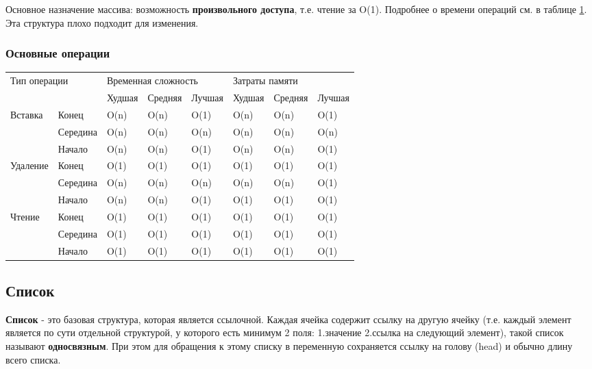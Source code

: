 			Основное назначение массива: возможность \textbf{произвольного доступа}, т.е. чтение за O(1). Подробнее о времени операций см. в таблице \ref{time:arr}.
			Эта структура плохо подходит для изменения.
			
			\subsubsection{Основные операции}
			
\begin{table}[h!]
\label{time:arr}
\begin{tabular}{|l|l|l|l|l|l|l|l|}
\hline
\multicolumn{2}{|l|}{\multirow{2}{*}{Тип операции}} & \multicolumn{3}{l|}{Временная сложность} & \multicolumn{3}{l|}{Затраты памяти} \\ \cline{3-8} 
\multicolumn{2}{|l|}{}                  & Худшая & Средняя & Лучшая & Худшая & Средняя & Лучшая		\\ \hline
\multirow{3}{*}{Вставка}     & Конец 	& O(n) 	 & O(n)    & O(1)   & O(n)   & O(n)    & O(1)		\\ \cline{2-8} 
                             & Середина & O(n) 	 & O(n)    & O(n)   & O(n)   & O(n)    & O(n)		\\ \cline{2-8} 
                             & Начало 	& O(n) 	 & O(n)    & O(1)   & O(n)   & O(n)    & O(1)		\\ \hline
\multirow{3}{*}{Удаление}    & Конец 	& O(1) 	 & O(1)    & O(1)   & O(1)   & O(1)    & O(1)		\\ \cline{2-8} 
                             & Середина & O(n) 	 & O(n)    & O(n)   & O(n)   & O(n)    & O(1)		\\ \cline{2-8} 
                             & Начало 	& O(n) 	 & O(n)    & O(1)   & O(1)   & O(1)    & O(1)		\\ \hline
\multirow{3}{*}{Чтение}      & Конец 	& O(1) 	 & O(1)    & O(1)   & O(1)   & O(1)    & O(1)		\\ \cline{2-8} 
                             & Середина & O(1) 	 & O(1)    & O(1)   & O(1)   & O(1)    & O(1)		\\ \cline{2-8} 
                             & Начало 	& O(1) 	 & O(1)    & O(1)   & O(1)   & O(1)    & O(1)		\\ \hline
							
\end{tabular}
\end{table}
		
		\subsection{Список}
		\textbf{Список} - это базовая структура, которая является ссылочной. Каждая ячейка содержит ссылку на другую ячейку (т.е. каждый элемент является по сути отдельной структурой, у которого есть минимум 2 поля: 1.значение 2.ссылка на следующий элемент), такой список называют \textbf{односвязным}. При этом для обращения к этому списку в переменную сохраняется ссылку на голову (head) и обычно длину всего списка.
		
